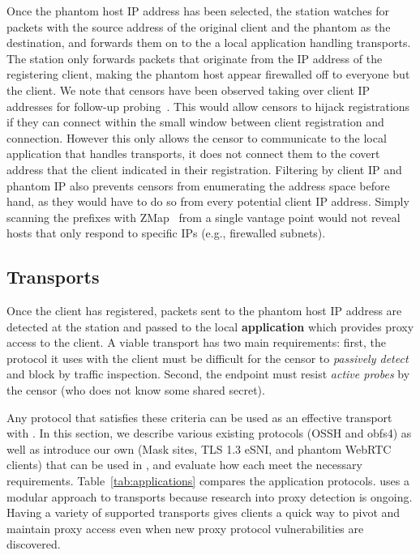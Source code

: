 \documentclass[sigconf]{acmart}
\newcommand{\TODO}[1]{}
\renewcommand{\TODO}[1]{{\color{red} TODO: {#1}}}
\begin{document}
Once the phantom host IP address has been selected, the station watches for
packets with the source address of the original client and the phantom as the destination, 
and forwards them on to the a local application handling transports. The station only 
forwards packets that originate from the IP address of the registering client, making the
 phantom host appear firewalled off to everyone but the client.
We note that censors have been observed taking over client IP
addresses for follow-up probing~\cite{ensafi-tor}. This would allow censors to
hijack registrations if they can connect within the small window between client 
registration and connection. However this only 
allows the censor to communicate to the local application that handles transports, 
it does not connect them to the covert address that the client indicated in their registration. 
Filtering by client IP and phantom IP also prevents censors from enumerating the
address space before hand, as they would have to do so from every potential
client IP address. Simply scanning the prefixes with ZMap~\cite{zmap13} from a
single vantage point would not reveal hosts that only respond to specific IPs
(e.g., firewalled subnets).


\subsection{Transports}

Once the client has registered, packets sent to the phantom host IP address are
detected at the station and passed to the local \textbf{application} which provides
proxy access to the client. A viable \scheme transport has
two main requirements: first, the protocol it uses with the client 
must be difficult for the censor to \emph{passively detect} and block by traffic
inspection. Second, the endpoint must resist \emph{active probes} by the censor (who
does not know some shared secret). 

Any protocol that satisfies these criteria can be used as an effective transport
with \scheme. In this section, we describe various existing protocols (OSSH and obfs4) as well
as introduce our own (Mask sites, TLS 1.3 eSNI, and phantom WebRTC clients) that
can be used in \scheme, and evaluate how each meet the necessary requirements.
Table~\ref{tab:applications} compares the application protocols. \scheme uses a modular 
approach to transports because research into proxy detection is ongoing.
Having a variety of supported transports gives clients a quick way to pivot and 
maintain proxy access even when new proxy protocol vulnerabilities are discovered.
\end{document}
